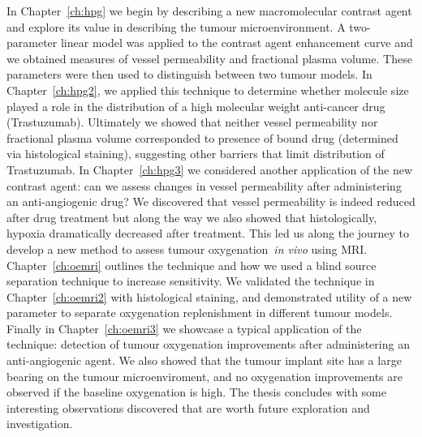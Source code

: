 In Chapter~\ref{ch:hpg} we begin by describing a new macromolecular contrast agent and explore its value in describing the tumour microenvironment.
A two-parameter linear model was applied to the contrast agent enhancement curve and we obtained measures of vessel permeability and fractional plasma volume.
These parameters were then used to distinguish between two tumour models.
In Chapter~\ref{ch:hpg2}, we applied this technique to determine whether molecule size played a role in the distribution of a high molecular weight anti-cancer drug (Trastuzumab).
Ultimately we showed that neither vessel permeability nor fractional plasma volume corresponded to presence of bound drug (determined via histological staining), suggesting other barriers that limit distribution of Trastuzumab.
In Chapter~\ref{ch:hpg3} we considered another application of the new contrast agent: can we assess changes in vessel permeability after administering an anti-angiogenic drug?
We discovered that vessel permeability is indeed reduced after drug treatment but along the way we also showed that histologically, hypoxia dramatically decreased after treatment. 
This led us along the journey to develop a new method to assess tumour oxygenation~\emph{in vivo} using MRI.
Chapter~\ref{ch:oemri} outlines the technique and how we used a blind source separation technique to increase sensitivity. 
We validated the technique in Chapter~\ref{ch:oemri2} with histological staining, and demonstrated utility of a new parameter to separate oxygenation replenishment in different tumour models.
Finally in Chapter~\ref{ch:oemri3} we showcase a typical application of the technique: detection of tumour oxygenation improvements after administering an anti-angiogenic agent. 
We also showed that the tumour implant site has a large bearing on the tumour microenviroment, and no oxygenation improvements are observed if the baseline oxygenation is high.
The thesis concludes with some interesting observations discovered that are worth future exploration and investigation.
